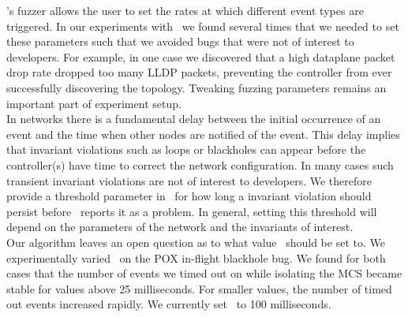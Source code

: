  \projectname's fuzzer allows the
user to set the rates at which different event types are triggered. In our experiments with
\projectname~we found several times that we needed to set these parameters
such that we avoided bugs that were not of interest to developers.
For example, in one case we discovered that a high dataplane
packet drop rate dropped too many LLDP packets, preventing the controller from ever successfully discovering the topology.
Tweaking fuzzing parameters remains an important
part of experiment setup.\\[0.5ex]
%
 In
networks there is a fundamental delay between the initial occurrence of an
event and the time when other nodes are notified of the event. This delay implies
that invariant violations such as loops or blackholes can appear
before the controller(s) have time to correct the network configuration. In
many cases such transient invariant violations are not of interest to
developers. We therefore provide a threshold parameter in \projectname~for
how long a invariant violation should persist before
\projectname~reports it as a problem. In general, setting this
threshold will depend on the parameters of the network and the invariants of
interest.\\[0.5ex]
 Our algorithm leaves an open question as to what value
\textepsilon~should be set to. We experimentally varied \textepsilon~on the
POX in-flight blackhole bug.
We found for both cases that the number of events we timed out on while isolating the MCS became stable for values above 25 milliseconds.
For smaller values, the number of timed out events increased rapidly. We
currently set \textepsilon~to 100 milliseconds.



